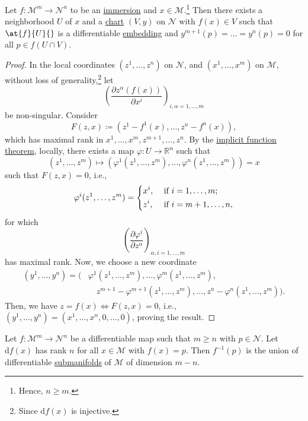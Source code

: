 \begin{lemma}
	Let \(f\colon \mathcal{M}^m \to \mathcal{N}^n \) to be an \hyperref[def:immersion]{immersion} and \(x\in \mathcal{M} \).\footnote{Hence, \(n \geq m\).} Then there exists a neighborhood \(U\) of \(x\) and a \hyperref[def:coordinate-chart]{chart} \((V, y)\) on \(\mathcal{N} \) with \(f(x)\in V\) such that \(\at{f}{U}{}\) is a differentiable \hyperref[def:embedding]{embedding} and \(y^{m+1}(p) = \ldots = y^n(p) = 0\) for all \(p\in f(U \cap V)\).
\end{lemma}
\begin{proof}
	In the local coordinates \((z^1, \ldots , z^n)\) on \(\mathcal{N} \), and \((x^1, \ldots , x^m)\) on \(\mathcal{M} \), without loss of generality,\footnote{Since \(\mathrm{d} f(x)\) is injective.} let
	\[
		\left( \frac{\partial z^\alpha (f(x))}{\partial x^i} \right) _{i, \alpha = 1, \ldots , m}
	\]
	be non-singular. Consider
	\[
		F(z, x) \coloneqq \left( z^1 - f^1(x), \ldots , z^n - f^n(x) \right),
	\]
	which has maximal rank in \(x^1, \ldots , x^m, z^{m+1}, \ldots , z^n\). By the \href{https://en.wikipedia.org/wiki/Implicit_function_theorem#Generalizations}{implicit function theorem}, locally, there exists a map \(\varphi \colon U \to \mathbb{R} ^n\) such that
	\[
		(z^1, \ldots , z^m) \mapsto (\varphi ^1(z^1, \ldots , z^m) , \ldots , \varphi ^n(z^1, \ldots , z^m)) = x
	\]
	such that \(F(z, x) = 0\), i.e.,
	\[
		\varphi ^i(z^1, \ldots , z^m) = \begin{dcases}
			x^i,   & \text{ if } i = 1, \ldots , m ;  \\
			z^{i}, & \text{ if } i = m+1, \ldots , n,
		\end{dcases}
	\]
	for which
	\[
		\left( \frac{\partial \varphi ^i}{\partial z^\alpha }  \right) _{\alpha , i = 1, \ldots , m}
	\]
	has maximal rank. Now, we choose a new coordinate
	\[
		\begin{split}
			(y^1, \ldots , y^n)
			= \big( &\varphi ^1(z^1, \ldots , z^m), \ldots , \varphi ^m (z^1, \ldots , z^m), \\
			&\quad z^{m+1} - \varphi ^{m+1}(z^1, \ldots , z^m), \ldots , z^n - \varphi ^n(z^1, \ldots , z^m) \big).
		\end{split}
	\]
	Then, we have \(z = f(x) \iff F(z, x) = 0\), i.e., \((y^1, \ldots , y^n) = (x^1, \ldots , x^n, 0, \ldots , 0)\), proving the result.
\end{proof}

\begin{lemma}
	Let \(f\colon \mathcal{M}^m \to  \mathcal{N}^n \) be a differentiable map such that \(m \geq n\) with \(p\in \mathcal{N} \). Let \(\mathrm{d} f(x)\) has rank \(n\) for all \(x\in \mathcal{M} \) with \(f(x) = p\). Then \(f^{-1} (p)\) is the union of differentiable \hyperref[def:submanifold]{submanifolds} of \(\mathcal{M} \) of dimension \(m - n\).
\end{lemma}

